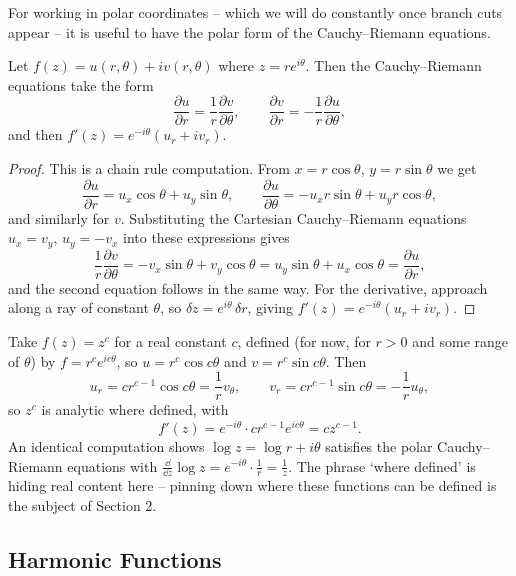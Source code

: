 \documentclass[a4paper]{scrartcl}
\begin{document}
For working in polar coordinates -- which we will do constantly once branch cuts appear -- it is useful to have the polar form of the Cauchy--Riemann equations.

\begin{proposition}
	Let $f(z) = u(r, \theta) + iv(r, \theta)$ where $z = re^{i\theta}$. Then the Cauchy--Riemann equations take the form
	$$
	\frac{\partial u}{\partial r} = \frac{1}{r}\frac{\partial v}{\partial \theta}, \qquad
	\frac{\partial v}{\partial r} = -\frac{1}{r} \frac{\partial u}{\partial \theta},
	$$
	and then $f'(z) = e^{-i\theta}\left(u_r + i v_r\right)$.
\end{proposition}
\begin{proof}
	This is a chain rule computation. From $x = r \cos\theta$, $y = r\sin \theta$ we get
	$$
	\frac{\partial u}{\partial r} = u_x \cos \theta + u_y \sin \theta, \qquad \frac{\partial u}{\partial \theta} = -u_x r \sin\theta + u_y r \cos\theta,
	$$
	and similarly for $v$. Substituting the Cartesian Cauchy--Riemann equations $u_x = v_y$, $u_y = -v_x$ into these expressions gives
	$$
	\frac{1}{r} \frac{\partial v}{\partial \theta} = -v_x \sin \theta + v_y \cos\theta = u_y \sin\theta + u_x \cos\theta = \frac{\partial u}{\partial r},
	$$
	and the second equation follows in the same way. For the derivative, approach along a ray of constant $\theta$, so $\delta z = e^{i\theta} \, \delta r$, giving $f'(z) = e^{-i\theta}(u_r + iv_r)$.
\end{proof}

\begin{example}
	Take $f(z) = z^c$ for a real constant $c$, defined (for now, for $r>0$ and some range of $\theta$) by $f = r^c e^{ic\theta}$, so $u = r^c \cos c\theta$ and $v = r^c \sin c\theta$. Then
	$$
	u_r = cr^{c-1}\cos c\theta = \frac{1}{r} v_\theta, \qquad v_r = c r^{c - 1} \sin c\theta = -\frac{1}{r} u_\theta,
	$$
	so $z^c$ is analytic where defined, with
	$$
	f'(z) = e^{-i\theta} \cdot c r^{c-1} e^{i c \theta} = c z^{c - 1}.
	$$
	An identical computation shows $\log z = \log r + i\theta$ satisfies the polar Cauchy--Riemann equations with $\frac{\dd}{\dd z} \log z = e^{-i\theta} \cdot \frac{1}{r} = \frac{1}{z}$. The phrase `where defined' is hiding real content here -- pinning down where these functions can be defined is the subject of Section 2.
\end{example}

\subsection{Harmonic Functions}
\end{document}
